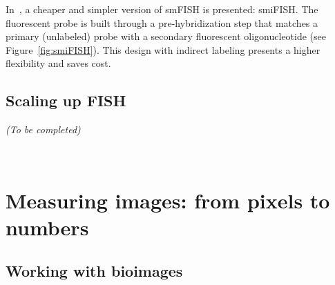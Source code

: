 In~\cite{tsanov_smifish_2016}, a cheaper and simpler version of \ac{smFISH} is presented: \ac{smiFISH}.
The fluorescent probe is built through a pre-hybridization step that matches a primary (unlabeled) probe with a secondary fluorescent oligonucleotide (see Figure~\ref{fig:smiFISH}).
This design with indirect labeling presents a higher flexibility and saves cost.

\subsection{Scaling up FISH}
\label{subsec:intro_scale_fish}

\begin{center}
	\textit{(To be completed)}
\end{center}




~\cite{lecuyer_global_2007} %
~\cite{Chen_2015} %
~\cite{lubeck_single_cell_2014} %
~\cite{eng_seqfish_2019} %




\section{Measuring images: from pixels to numbers}
\label{sec:computation_biology}

\subsection{Working with bioimages}
\label{subsec:intro_bioimages}

